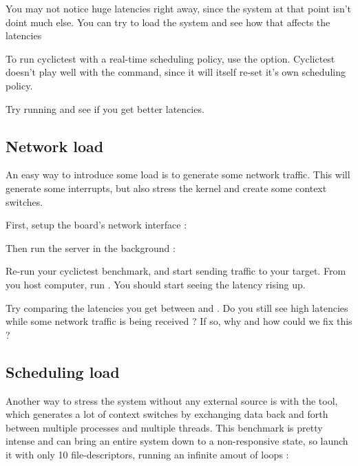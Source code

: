 You may not notice huge latencies right away, since the system at that point isn't
doint much else. You can try to load the system and see how that affects the latencies

To run cyclictest with a real-time scheduling policy, use the  option.
Cyclictest doesn't play well with the  command, since it will itself re-set
it's own scheduling policy.

Try running  and see if you get better latencies.

\subsection{Network load}

An easy way to introduce some load is to generate some network traffic. This will
generate some interrupts, but also stress the kernel and create some context switches.

First, setup the board's network interface :



Then run the  server in the background :


Re-run your cyclictest benchmark, and start sending traffic to your target. From
you host computer, run . You should start
seeing the latency rising up.

Try comparing the latencies you get between  and . Do you
still see high latencies while some network traffic is being received ? If so, why and how
could we fix this ?

\subsection{Scheduling load}

Another way to stress the system without any external source is with the 
tool, which generates a lot of context switches by exchanging data back and forth between
multiple processes and multiple threads. This benchmark is pretty intense and can bring
an entire system down to a non-responsive state, so launch it with only 10 file-descriptors,
running an infinite amout of loops :


